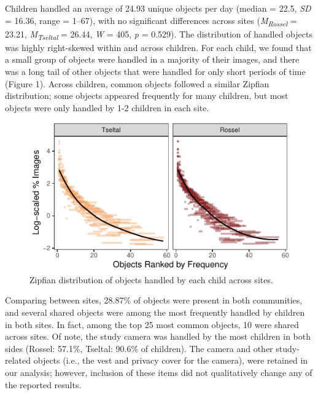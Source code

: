 \documentclass[10pt, letterpaper]{article}
\newenvironment{CodeChunk}{}{}
\begin{document}
Children handled an average of 24.93 unique objects per day (median =
22.5, \emph{SD} = 16.36, range = 1--67), with no significant differences
across sites (\emph{M}\textsubscript{\emph{Rossel}} = 23.21,
\emph{M}\textsubscript{\emph{Tseltal}} = 26.44, \emph{W} = 405, \emph{p}
= 0.529). The distribution of handled objects was highly right-skewed
within and across children. For each child, we found that a small group
of objects were handled in a majority of their images, and there was a
long tail of other objects that were handled for only short periods of
time (Figure 1). Across children, common objects followed a similar
Zipfian distribution; some objects appeared frequently for many
children, but most objects were only handled by 1-2 children in each
site.

\begin{CodeChunk}
\begin{figure}[h]

{\centering \includegraphics{figs/zipfian-objects-fig-1} 

}

\caption[Zipfian distribution of objects handled by each child across sites]{Zipfian distribution of objects handled by each child across sites.}\label{fig:zipfian-objects-fig}
\end{figure}
\end{CodeChunk}

Comparing between sites, 28.87\% of objects were present in both
communities, and several shared objects were among the most frequently
handled by children in both sites. In fact, among the top 25 most common
objects, 10 were shared across sites. Of note, the study camera was
handled by the most children in both sides (Rossel: 57.1\%, Tseltal:
90.6\% of children). The camera and other study-related objects (i.e.,
the vest and privacy cover for the camera), were retained in our
analysis; however, inclusion of these items did not qualitatively change
any of the reported results.
\end{document}
